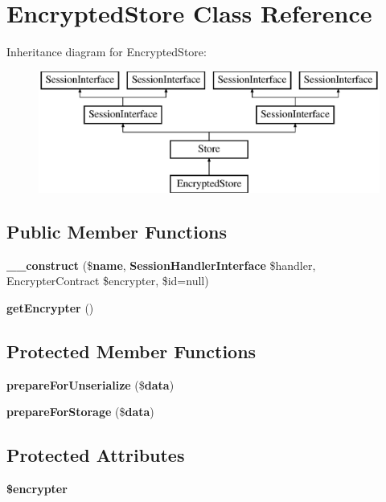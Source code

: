\section{Encrypted\+Store Class Reference}
\label{class_illuminate_1_1_session_1_1_encrypted_store}
Inheritance diagram for Encrypted\+Store\+:\begin{figure}[H]
\begin{center}
\leavevmode
\includegraphics[height=4.000000cm]{class_illuminate_1_1_session_1_1_encrypted_store}
\end{center}
\end{figure}
\subsection*{Public Member Functions}
\begin{DoxyCompactItemize}
\item 
{\bf \+\_\+\+\_\+construct} (\${\bf name}, {\bf Session\+Handler\+Interface} \$handler, Encrypter\+Contract \$encrypter, \$id=null)
\item 
{\bf get\+Encrypter} ()
\end{DoxyCompactItemize}
\subsection*{Protected Member Functions}
\begin{DoxyCompactItemize}
\item 
{\bf prepare\+For\+Unserialize} (\${\bf data})
\item 
{\bf prepare\+For\+Storage} (\${\bf data})
\end{DoxyCompactItemize}
\subsection*{Protected Attributes}
\begin{DoxyCompactItemize}
\item 
{\bf \$encrypter}
\end{DoxyCompactItemize}


